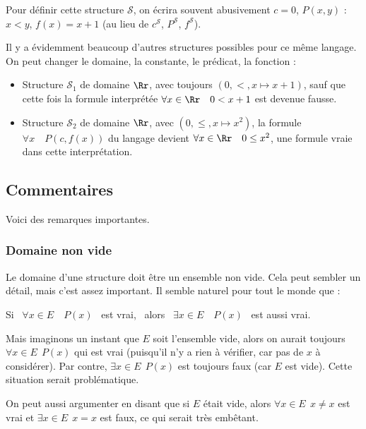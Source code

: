 \documentclass[11pt,class=report,crop=false]{standalone}
\begin{document}
Pour définir cette structure $\mathcal{S}$, on écrira souvent abusivement $c=0$, $P(x,y)$ : $x < y$, $f(x) = x+1$ (au lieu de $c^{\mathcal{S}}$, $P^{\mathcal{S}}$, $f^{\mathcal{S}}$).

\bigskip

Il y a évidemment beaucoup d'autres structures possibles pour ce même langage. 
On peut changer le domaine, la constante, le prédicat, la fonction :
\begin{itemize}
	\item Structure $\mathcal{S}_1$ de domaine $\Rr$, avec toujours $(0, <, x \mapsto x+1)$, sauf que cette fois la formule interprétée $\forall x \in \Rr \quad 0 < x+1$ est devenue fausse.
	
	\item Structure $\mathcal{S}_2$ de domaine $\Rr$, avec $(0, \le, x \mapsto x^2)$,
	la formule $\forall x \quad P( c, f(x))$ du langage devient $\forall x \in \Rr \quad 0 \le x^2$, une formule vraie dans cette interprétation.
\end{itemize}


\subsection{Commentaires}

Voici des remarques importantes.

\subsubsection{Domaine non vide}

Le domaine d'une structure doit être un ensemble non vide. Cela peut sembler un détail, mais c'est assez important. Il semble naturel pour tout le monde que :
\begin{center}
Si \ \og{}$\forall x \in E \quad P(x)$\fg{} \ est vrai,
\ alors \ 
\og{}$\exists x \in E \quad P(x)$\fg{} \  est aussi vrai.	
\end{center}

Mais imaginons un instant que $E$ soit l'ensemble vide, alors on aurait toujours \og{}$\forall x \in E \  \ P(x)$\fg{} qui est vrai (puisqu'il n'y a rien à vérifier, car pas de $x$ à considérer).
Par contre, \og{}$\exists x \in E \ \  P(x)$\fg{} est toujours faux (car $E$ est vide). 
Cette situation serait problématique.

On peut aussi argumenter en disant que si $E$ était vide, alors  \og{}$\forall x \in E \ \  x \neq x$\fg{} est vrai et \og{}$\exists x \in E \ \ x = x$\fg{} est faux, ce qui serait très embêtant.
\end{document}
